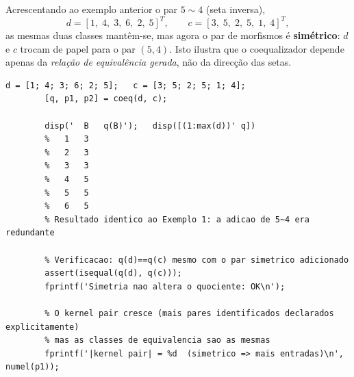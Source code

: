 \begin{example}
	\label{ex:coeq2}
	Acrescentando ao exemplo anterior o par $5 \sim 4$ (seta inversa),
	\[
	d = [1,\;4,\;3,\;6,\;2,\;5]^T, \qquad c = [3,\;5,\;2,\;5,\;1,\;4]^T,
	\]
	as mesmas duas classes mantêm-se, mas agora o par de morfismos é
	\textbf{simétrico}: $d$ e $c$ trocam de papel para o par $(5,4)$.
	Isto ilustra que o coequalizador depende apenas da
	\emph{relação de equivalência gerada}, não da direcção das setas.
	
	\begin{lstlisting}[style=matlab, caption={Exemplo 2 de \texttt{coeq.m} --- par simétrico}]
		d = [1; 4; 3; 6; 2; 5];   c = [3; 5; 2; 5; 1; 4];
		[q, p1, p2] = coeq(d, c);
		
		disp('  B   q(B)');   disp([(1:max(d))' q])
		%   1   3
		%   2   3
		%   3   3
		%   4   5
		%   5   5
		%   6   5
		% Resultado identico ao Exemplo 1: a adicao de 5~4 era redundante
		
		% Verificacao: q(d)==q(c) mesmo com o par simetrico adicionado
		assert(isequal(q(d), q(c)));
		fprintf('Simetria nao altera o quociente: OK\n');
		
		% O kernel pair cresce (mais pares identificados declarados explicitamente)
		% mas as classes de equivalencia sao as mesmas
		fprintf('|kernel pair| = %d  (simetrico => mais entradas)\n', numel(p1));
	\end{lstlisting}
\end{example}

